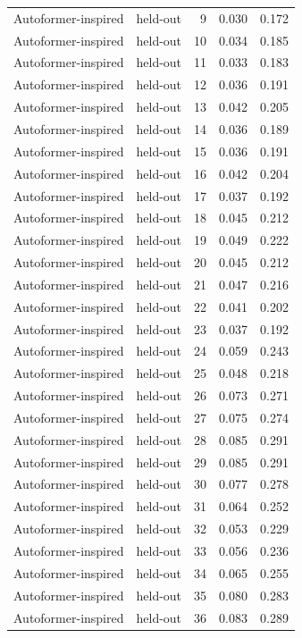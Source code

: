 \begin{tabular}{llrrr}
Autoformer-inspired & held-out & 9 & 0.030 & 0.172 \\
Autoformer-inspired & held-out & 10 & 0.034 & 0.185 \\
Autoformer-inspired & held-out & 11 & 0.033 & 0.183 \\
Autoformer-inspired & held-out & 12 & 0.036 & 0.191 \\
Autoformer-inspired & held-out & 13 & 0.042 & 0.205 \\
Autoformer-inspired & held-out & 14 & 0.036 & 0.189 \\
Autoformer-inspired & held-out & 15 & 0.036 & 0.191 \\
Autoformer-inspired & held-out & 16 & 0.042 & 0.204 \\
Autoformer-inspired & held-out & 17 & 0.037 & 0.192 \\
Autoformer-inspired & held-out & 18 & 0.045 & 0.212 \\
Autoformer-inspired & held-out & 19 & 0.049 & 0.222 \\
Autoformer-inspired & held-out & 20 & 0.045 & 0.212 \\
Autoformer-inspired & held-out & 21 & 0.047 & 0.216 \\
Autoformer-inspired & held-out & 22 & 0.041 & 0.202 \\
Autoformer-inspired & held-out & 23 & 0.037 & 0.192 \\
Autoformer-inspired & held-out & 24 & 0.059 & 0.243 \\
Autoformer-inspired & held-out & 25 & 0.048 & 0.218 \\
Autoformer-inspired & held-out & 26 & 0.073 & 0.271 \\
Autoformer-inspired & held-out & 27 & 0.075 & 0.274 \\
Autoformer-inspired & held-out & 28 & 0.085 & 0.291 \\
Autoformer-inspired & held-out & 29 & 0.085 & 0.291 \\
Autoformer-inspired & held-out & 30 & 0.077 & 0.278 \\
Autoformer-inspired & held-out & 31 & 0.064 & 0.252 \\
Autoformer-inspired & held-out & 32 & 0.053 & 0.229 \\
Autoformer-inspired & held-out & 33 & 0.056 & 0.236 \\
Autoformer-inspired & held-out & 34 & 0.065 & 0.255 \\
Autoformer-inspired & held-out & 35 & 0.080 & 0.283 \\
Autoformer-inspired & held-out & 36 & 0.083 & 0.289 \\

\end{tabular}
